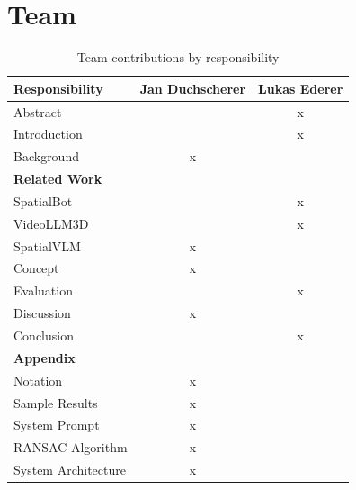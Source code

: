 \section{Team}


\begin{table}[h]
\centering
\begin{tabular}{|l|c|c|}
\hline
\textbf{Responsibility} & \textbf{Jan Duchscherer} & \textbf{Lukas Ederer} \\
\hline
Abstract &  & x \\
\hline
Introduction &  & x \\
\hline
Background & x &  \\
\hline
\multicolumn{3}{|l|}{\textbf{Related Work}} \\
\hline
\quad SpatialBot &  & x \\
\hline
\quad VideoLLM3D &  & x \\
\hline
\quad SpatialVLM & x &  \\
\hline
Concept & x &  \\
\hline
Evaluation &  & x \\
\hline
Discussion & x & \\
\hline
Conclusion &  & x \\
\hline
\multicolumn{3}{|l|}{\textbf{Appendix}} \\
\hline
\quad Notation & x &  \\
\hline
\quad Sample Results & x &  \\
\hline
\quad System Prompt & x &  \\
\hline
\quad RANSAC Algorithm & x &  \\
\quad System Architecture & x &  \\
\hline
\end{tabular}
\caption{Team contributions by responsibility}
\label{tab:team_responsibilities}
\end{table}